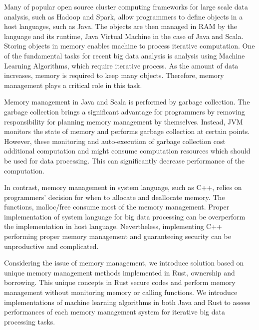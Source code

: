 
Many of popular open source cluster computing frameworks for large scale data analysis, such as Hadoop and Spark, 
allow programmers to define objects in a host languages, such as Java. The objects are then managed in RAM 
by the language and its runtime, Java Virtual Machine in the case of Java and Scala. Storing objects 
in memory enables machine to process iterative computation. One of the fundamental tasks for recent big data analysis 
is analysis using Machine Learning Algorithms, which require iterative process. As the amount of data increases, memory is required to keep many objects. 
Therefore, memory management plays a critical role in this task. 

Memory management in Java and Scala is performed by garbage collection. The garbage collection brings a significant advantage 
for programmers by removing responsibility for planning memory management by themselves. Instead, JVM monitors the state of memory 
and performs garbage collection at certain points. However, these monitoring and auto-execution of garbage collection cost additional computation 
and might consume computation resources which should be used for data processing. This can significantly decrease performance of the computation. 

In contrast, memory management in system language, such as C++, relies on programmers’ decision for when to allocate and deallocate memory. 
The functions, malloc/free consume most of the memory management. Proper implementation of system language for big data processing can be overperform the implementation in host language. 
Nevertheless, implementing C++ performing proper memory management and guaranteeing security can be unproductive and complicated. 

Considering the issue of memory management, we introduce solution based on unique memory management methods implemented in Rust, ownership and borrowing. 
This unique concepts in Rust secure codes and perform memory management without monitoring memory or calling functions. 
We introduce implementations of machine learning algorithms in both Java and Rust to assess performances of each memory management system for iterative big data processing tasks.

